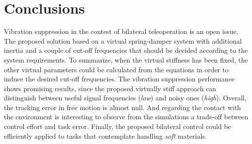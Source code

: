 \newpage
\section{Conclusions}
Vibration suppression in the contest of bilateral teleoperation is an open
issue.
\newline
The proposed solution based on a virtual spring-damper system with additional
inertia and a couple of cut-off frequencies that should be decided according to
the system requirements.
\bigskip
\newline
To summarize, when the virtual stiffness has been fixed,  the other virtual
parameters could be calculated from the equations in order to induce the desired
cut-off frequencies.
\bigskip
\newline
The vibration suppression performance shows promising results, since the
proposed virtually stiff approach can distinguish between useful signal
frequencies (\textsl{low}) and noisy ones (\textsl{high}). 
\bigskip
\newline
Overall, the tracking error in free motion is almost null. And regarding the contact with the environment is
interesting to observe from the simulations a trade-off
between control effort and task error.
\bigskip
\newline
Finally, the proposed bilateral control could be efficiently applied to tasks
that contemplate handling \textsl{soft} materials.



